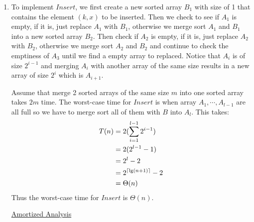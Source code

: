 \documentclass[11pt]{article}
\DeclarePairedDelimiter\ceil{\lceil}{\rceil}
\begin{document}
\begin{enumerate}
\begin{enumerate}
\item %
  To implement $Insert$, we first create a new sorted array $B_1$ with
  size of 1 that contains the element $(k,x)$ to be inserted. Then we
  check to see if $A_1$ is empty, if it is, just replace $A_1$ with
  $B_1$, otherwise we merge sort $A_1$ and $B_1$ into a new sorted array
  $B_2$. Then check if $A_2$ is empty, if it is, just replace $A_2$
  with $B_2$, otherwise we merge sort $A_2$ and $B_2$ and continue to
  check the emptiness of $A_3$ until we find a empty array to
  replaced. Notice that $A_i$ is of size $2^{i-1}$ and merging $A_i$ with
  another array of the same size results in a new array of size
  $2^{i}$ which is $A_{i+1}$.



Assume that merge 2 sorted arrays of the same size $m$ into one sorted
array takes $2m$ time.
The worst-case time for $Insert$ is when array $A_1,\cdots,A_{l-1}$ are
all full so we have to merge sort all of them with $B$ into
$A_l$. This takes:
  \begin{align}
    T(n) &= 2(\sum_{i=1}^{l-1} 2^{i-1})\\
    &= 2(2^{l-1} - 1)\\
    &= 2^l - 2\\
    &= 2^{\ceil{\lg (n+1)}} - 2\\
    &= \Theta(n)
  \end{align}
  Thus the worst-case time for $Insert$ is $\Theta(n)$.

  \underline{Amortized Analysis}
  

\end{enumerate}
\end{enumerate}
\end{document}
